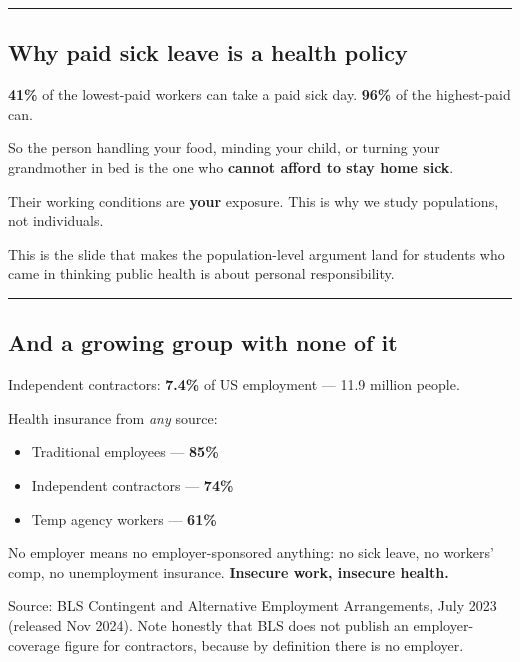 \documentclass[
  letterpaper,
  DIV=11,
  numbers=noendperiod]{scrartcl}
\providecommand{\tightlist}{%
  \setlength{\itemsep}{0pt}\setlength{\parskip}{0pt}}
\begin{document}
\begin{center}\rule{0.5\linewidth}{0.5pt}\end{center}

\subsection{\texorpdfstring{{\textbf{Why paid sick leave is a health
policy}}}{Why paid sick leave is a health policy}}\label{why-paid-sick-leave-is-a-health-policy}

\textbf{41\%} of the lowest-paid workers can take a paid sick day.
\textbf{96\%} of the highest-paid can.

So the person handling your food, minding your child, or turning your
grandmother in bed is the one who \textbf{cannot afford to stay home
sick}.

Their working conditions are \textbf{your} exposure. This is why we
study populations, not individuals.

This is the slide that makes the population-level argument land for
students who came in thinking public health is about personal
responsibility.

\begin{center}\rule{0.5\linewidth}{0.5pt}\end{center}

\subsection{\texorpdfstring{{\textbf{And a growing group with none of
it}}}{And a growing group with none of it}}\label{and-a-growing-group-with-none-of-it}

Independent contractors: \textbf{7.4\%} of US employment --- 11.9
million people.

Health insurance from \emph{any} source:

\begin{itemize}
\tightlist
\item
  Traditional employees --- \textbf{85\%}
\item
  Independent contractors --- \textbf{74\%}
\item
  Temp agency workers --- \textbf{61\%}
\end{itemize}

No employer means no employer-sponsored anything: no sick leave, no
workers' comp, no unemployment insurance. \textbf{Insecure work,
insecure health.}

Source: BLS Contingent and Alternative Employment Arrangements, July
2023 (released Nov 2024). Note honestly that BLS does not publish an
employer-coverage figure for contractors, because by definition there is
no employer.
\end{document}
